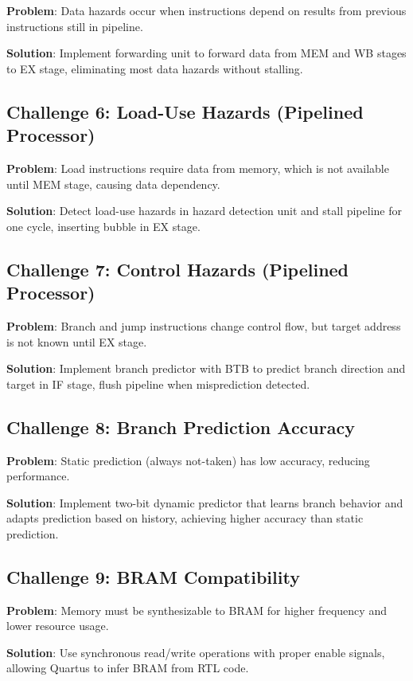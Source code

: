 \textbf{Problem}: Data hazards occur when instructions depend on results from previous instructions still in pipeline.

\textbf{Solution}: Implement forwarding unit to forward data from MEM and WB stages to EX stage, eliminating most data hazards without stalling.

\subsection{Challenge 6: Load-Use Hazards (Pipelined Processor)}

\textbf{Problem}: Load instructions require data from memory, which is not available until MEM stage, causing data dependency.

\textbf{Solution}: Detect load-use hazards in hazard detection unit and stall pipeline for one cycle, inserting bubble in EX stage.

\subsection{Challenge 7: Control Hazards (Pipelined Processor)}

\textbf{Problem}: Branch and jump instructions change control flow, but target address is not known until EX stage.

\textbf{Solution}: Implement branch predictor with BTB to predict branch direction and target in IF stage, flush pipeline when misprediction detected.

\subsection{Challenge 8: Branch Prediction Accuracy}

\textbf{Problem}: Static prediction (always not-taken) has low accuracy, reducing performance.

\textbf{Solution}: Implement two-bit dynamic predictor that learns branch behavior and adapts prediction based on history, achieving higher accuracy than static prediction.

\subsection{Challenge 9: BRAM Compatibility}

\textbf{Problem}: Memory must be synthesizable to BRAM for higher frequency and lower resource usage.

\textbf{Solution}: Use synchronous read/write operations with proper enable signals, allowing Quartus to infer BRAM from RTL code.

